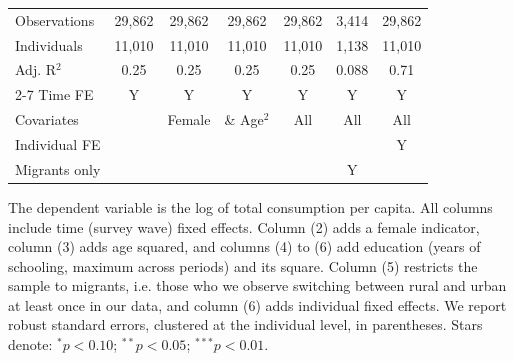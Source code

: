 \begin{table}[htbp]
\begin{threeparttable}
\begin{tabular}{l cccccc}
\addlinespace
Observations        &      29,862   &      29,862   &      29,862   &      29,862   &       3,414   &      29,862   \\
Individuals         &      11,010   &      11,010   &      11,010   &      11,010   &       1,138   &      11,010   \\
Adj. R$^{2}$        &        0.25   &        0.25   &        0.25   &        0.25   &       0.088   &        0.71   \\
\cmidrule{2-7} Time FE & Y & Y & Y & Y & Y & Y \\ Covariates & & Female & \& Age$^2$ & All & All & All \\ Individual FE & & & & & & Y \\ Migrants only & & & & & Y & \\ \bottomrule \end{tabular} \begin{tablenotes}[flushleft] \footnotesize \item{The dependent variable is the log of total consumption per capita. All columns include time (survey wave) fixed effects. Column (2) adds a female indicator, column (3) adds age squared, and columns (4) to (6) add education (years of schooling, maximum across periods) and its square. Column (5) restricts the sample to migrants, i.e. those who we observe switching between rural and urban at least once in our data, and column (6) adds individual fixed effects. We report robust standard errors, clustered at the individual level, in parentheses. Stars denote: $^{*} p<0.10$; $^{**} p<0.05$; $^{***} p<0.01$.} \end{tablenotes} \end{threeparttable} \end{table}
